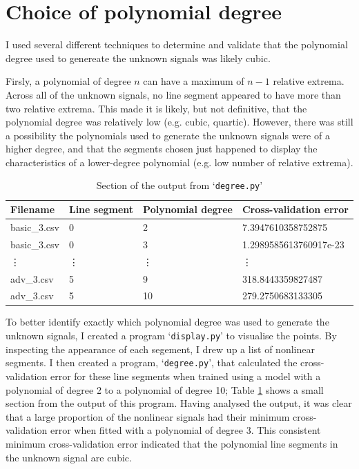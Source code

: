 \documentclass[onecolumn, 12pt, a4paper]{article}
\begin{document}
\section{Choice of polynomial degree}

I used several different techniques to determine and validate that
the polynomial degree used to genereate the unknown signals was likely cubic.

Firsly, a polynomial of degree $n$ can have a maximum of $n - 1$ relative extrema.
Across all of the unknown signals, no line segment appeared to have more than two relative extrema.
This made it is likely, but not definitive, that the polynomial degree was relatively low (e.g. cubic, quartic).
However, there was still a possibility the polynomials used to generate the unknown signals
were of a higher degree, and that the segments chosen just happened to display
the characteristics of a lower-degree polynomial (e.g. low number of relative extrema).

\begin{table}[htbp]
    \begin{center}
        \caption{\label{tab:degree.py}Section of the output from `\texttt{degree.py}'}
    \begin{tabular}{l l l l} 
        \hline\hline
        Filename & Line segment & Polynomial degree & Cross-validation error \\ [0.5ex] 
        \hline
        basic\_3.csv & 0 & 2 & 7.3947610358752875 \\ 
        basic\_3.csv & 0 & 3 & 1.2989585613760917e-23 \\
        \vdots & \vdots & \vdots & \vdots \\
        adv\_3.csv & 5 & 9 & 318.8443359827487 \\
        adv\_3.csv & 5 & 10 & 279.2750683133305 \\
        \hline
    \end{tabular}
    \end{center}
\end{table}

To better identify exactly which polynomial degree was used
to generate the unknown signals, I created a program
`\texttt{display.py}' to visualise the points.
By inspecting the appearance of each segement, I drew up
a list of nonlinear segments.
I then created a program, `\texttt{degree.py}', that calculated
the cross-validation error for these line segments
when trained using a model with a polynomial of degree 2
to a polynomial of degree 10; Table \ref{tab:degree.py}
shows a small section from the output of this program.
Having analysed the output, it was clear that a large
proportion of the nonlinear signals had their minimum
cross-validation error when fitted with a polynomial of degree
3.
This consistent minimum cross-validation error indicated
that the polynomial line segments in the unknown signal are cubic.
\end{document}
